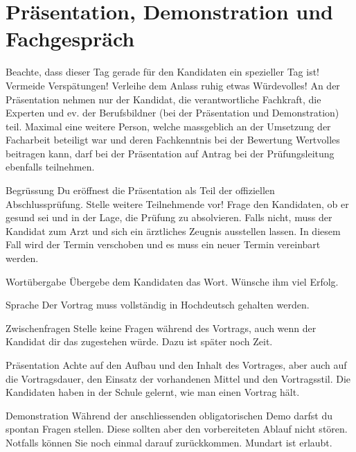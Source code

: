 \section{Präsentation, Demonstration und Fachgespräch}
Beachte, dass dieser Tag gerade für den Kandidaten ein spezieller Tag ist! Vermeide Verspätungen! Verleihe dem Anlass ruhig etwas Würdevolles! An der Präsentation nehmen nur der Kandidat, die verantwortliche Fachkraft, die Experten und ev. der Berufsbildner (bei der Präsentation und Demonstration) teil. Maximal eine weitere Person, welche massgeblich an der Umsetzung der Facharbeit beteiligt war und deren Fachkenntnis bei der Bewertung Wertvolles beitragen kann, darf bei der Präsentation auf Antrag bei der Prüfungsleitung ebenfalls teilnehmen.

\begin{taskitem}{Begrüssung}
  Du eröffnest die Präsentation als Teil der offiziellen Abschlussprüfung. Stelle weitere Teilnehmende vor! Frage den Kandidaten, ob er gesund sei und in der Lage, die Prüfung zu absolvieren. Falls nicht, muss der Kandidat zum Arzt und sich ein ärztliches Zeugnis ausstellen lassen. In diesem Fall wird der Termin verschoben und es muss ein neuer Termin vereinbart werden.
\end{taskitem}
\begin{taskitemwithoutcomment}{Wortübergabe}
  Übergebe dem Kandidaten das Wort. Wünsche ihm viel Erfolg.
\end{taskitemwithoutcomment}
\begin{taskitem}{Sprache}
  Der Vortrag muss vollständig in Hochdeutsch gehalten werden.
\end{taskitem}
\begin{taskitemwithoutcomment}{Zwischenfragen}
  Stelle keine Fragen während des Vortrags, auch wenn der Kandidat dir das zugestehen würde. Dazu ist später noch Zeit.
\end{taskitemwithoutcomment}
\begin{taskitem}{Präsentation}
  Achte auf den Aufbau und den Inhalt des Vortrages, aber auch auf die Vortragsdauer, den Einsatz der vorhandenen Mittel und den Vortragsstil. Die Kandidaten haben in der Schule gelernt, wie man einen Vortrag hält.
\end{taskitem}
\begin{taskitem}{Demonstration}
  Während der anschliessenden obligatorischen Demo darfst du spontan Fragen stellen. Diese sollten aber den vorbereiteten Ablauf nicht stören. Notfalls können Sie noch einmal darauf zurückkommen. Mundart ist erlaubt.
\end{taskitem}
